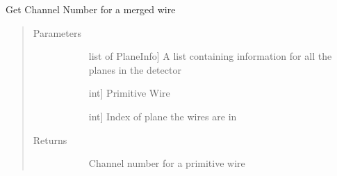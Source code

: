 \documentclass[letterpaper,10pt,english]{sphinxmanual}
\begin{document}
\begin{fulllineitems}
\label{\detokenize{utilities:utilities.getChannelNo}}
Get Channel Number for a merged wire
\begin{quote}\begin{description}
\item[{Parameters}] \leavevmode\begin{description}
\item[{}] \leavevmode{[}list of PlaneInfo{]}
A list containing information for all the planes in the detector

\item[{}] \leavevmode{[}int{]}
Primitive Wire

\item[{}] \leavevmode{[}int{]}
Index of plane the wires are in

\end{description}

\item[{Returns}] \leavevmode\begin{description}
\item[{}] \leavevmode
Channel number for a primitive wire

\end{description}

\end{description}\end{quote}

\end{fulllineitems}

\end{document}
